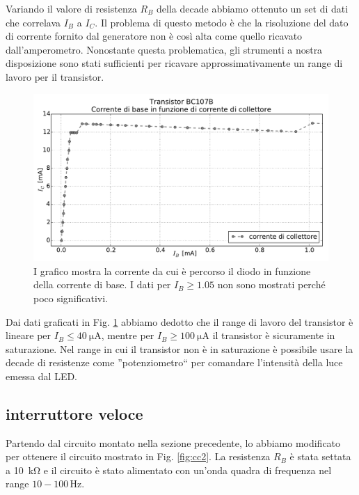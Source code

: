 Variando il valore di resistenza $R_B$ della decade abbiamo ottenuto un set di dati che correlava $I_B$ a $I_C$. Il problema di questo metodo è che la risoluzione del dato di corrente fornito dal generatore non è così alta come quello ricavato dall'amperometro. Nonostante questa problematica, gli strumenti a nostra disposizione sono stati sufficienti per ricavare approssimativamente un range di lavoro per il transistor.


\begin{figure}
	\includegraphics[width=120mm]{saturazione_2.pdf}
	\caption{I grafico mostra la corrente da cui è percorso il diodo in funzione della corrente di base. I dati per $I_B \geq 1.05$ non sono mostrati perché poco significativi.}
	\label{fig:saturazione}
\end{figure}

Dai dati graficati in Fig. \ref{fig:saturazione} abbiamo dedotto che il range di lavoro del transistor è lineare per $I_B \leq \SI{40}{\micro\ampere}$, mentre per $I_B \geq \SI{100}{\micro\ampere}$ il transistor è sicuramente in saturazione. Nel range in cui il transistor non è in saturazione è possibile usare la decade di resistenze come ''potenziometro`` per comandare l'intensità della luce emessa dal LED.

\subsection{interruttore veloce}
Partendo dal circuito montato nella sezione precedente, lo abbiamo modificato per ottenere il circuito mostrato in Fig. \ref{fig:cc2}. La resistenza $R_B$ è stata settata a \SI{10}{\kilo\ohm} e il circuito è stato alimentato con un'onda quadra di frequenza nel range $10-100\,\si{\hertz}$.

